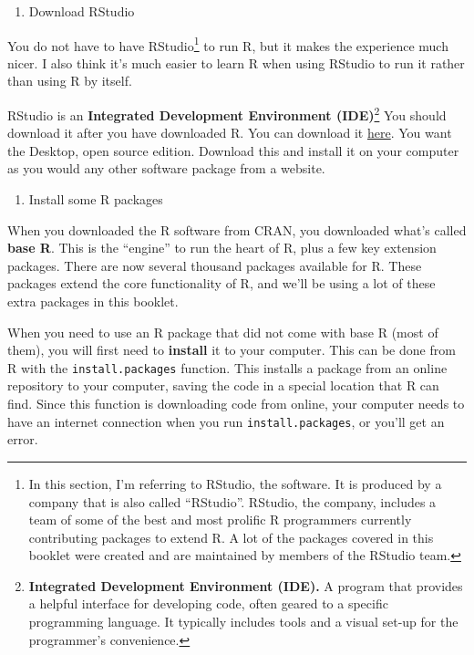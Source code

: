 \documentclass[]{tufte-book}
\providecommand{\tightlist}{%
  \setlength{\itemsep}{0pt}\setlength{\parskip}{0pt}}
\begin{document}
\begin{enumerate}
\def\labelenumi{\arabic{enumi}.}
\setcounter{enumi}{1}
\tightlist
\item
  Download RStudio
\end{enumerate}

You do not have to have RStudio\footnote{In this section, I'm referring to RStudio, the software. It is
  produced by a company that is also called ``RStudio''. RStudio, the company, includes a team of some
  of the best and most prolific R programmers currently contributing packages to extend R. A lot of
  the packages covered in this booklet were created and are maintained by members of the RStudio team.}
to run R, but it makes the experience much nicer. I also
think it's much easier to learn R when using RStudio to run it rather than using R by itself.

RStudio is an \textbf{Integrated Development Environment (IDE)}\footnote{\textbf{Integrated Development
  Environment (IDE).} A program that provides a helpful interface for developing code, often
  geared to a specific programming language. It typically includes tools and a visual
  set-up for the programmer's convenience.}
You should download it after you have downloaded R. You can download it
\href{https://www.rstudio.com/products/rstudio/\#Desktop}{here}. You want the Desktop, open source
edition. Download this and install it on your computer as you would any other software package
from a website.

\begin{enumerate}
\def\labelenumi{\arabic{enumi}.}
\setcounter{enumi}{2}
\tightlist
\item
  Install some R packages
\end{enumerate}

When you downloaded the R software from CRAN, you downloaded what's called \textbf{base R}. This
is the ``engine'' to run the heart of R, plus a few key extension packages. There are now
several thousand packages available for R. These packages extend the core functionality of
R, and we'll be using a lot of these extra packages in this booklet.

When you need to use an R package that did not come with base R (most of them), you will first
need to \textbf{install} it to your computer. This can be done from R with the \texttt{install.packages}
function. This installs a package from an online repository to your computer, saving the code
in a special location that R can find. Since this function is downloading code from online,
your computer needs to have an internet connection when you run \texttt{install.packages}, or you'll
get an error.
\end{document}
